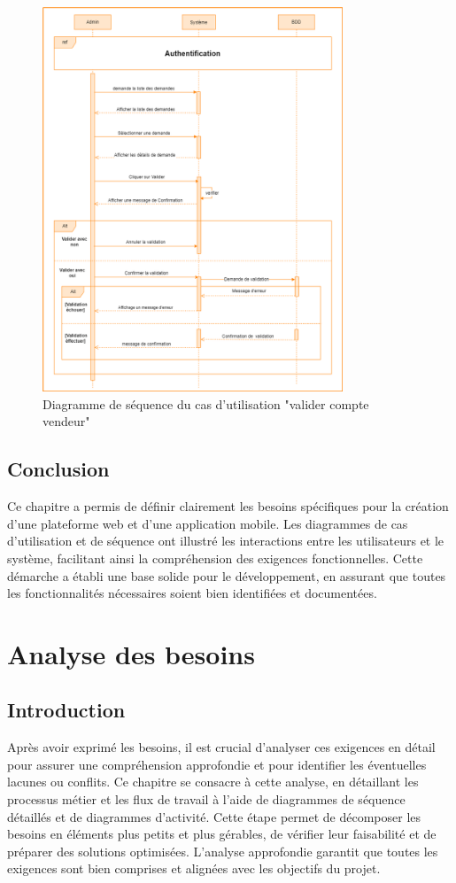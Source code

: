 \documentclass[edit,12pt,a4paper,ChapStyle,oneside,doubleinterligne]{report}
\begin{document}
\begin{figure}[h!]\label{fig:Diagramme cas 12}
\centering
\includegraphics[width=0.8\textwidth]{images/valider compte vendeur.png}
\caption{Diagramme de séquence du cas d'utilisation "valider compte vendeur"}
\end{figure}
\clearpage
\section{Conclusion}
Ce chapitre a permis de définir clairement les besoins spécifiques pour la création d'une plateforme web et d'une application mobile. Les diagrammes de cas d'utilisation et de séquence ont illustré les interactions entre les utilisateurs et le système, facilitant ainsi la compréhension des exigences fonctionnelles. Cette démarche a établi une base solide pour le développement, en assurant que toutes les fonctionnalités nécessaires soient bien identifiées et documentées.
\chapter{Analyse des besoins}
\section{Introduction}
Après avoir exprimé les besoins, il est crucial d'analyser ces exigences en détail pour assurer une compréhension approfondie et pour identifier les éventuelles lacunes ou conflits. Ce chapitre se consacre à cette analyse, en détaillant les processus métier et les flux de travail à l'aide de diagrammes de séquence détaillés et de diagrammes d'activité. Cette étape permet de décomposer les besoins en éléments plus petits et plus gérables, de vérifier leur faisabilité et de préparer des solutions optimisées. L'analyse approfondie garantit que toutes les exigences sont bien comprises et alignées avec les objectifs du projet.
\end{document}
